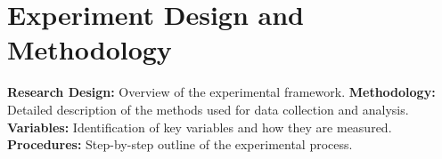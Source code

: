 \section{Experiment Design and Methodology}\label{section:Experiment_Design_and_Methodology}
\textbf{Research Design:} Overview of the experimental framework.\newline
\textbf{Methodology:} Detailed description of the methods used for data collection and analysis.\newline
\textbf{Variables:} Identification of key variables and how they are measured.\newline
\textbf{Procedures:} Step-by-step outline of the experimental process.\newline
